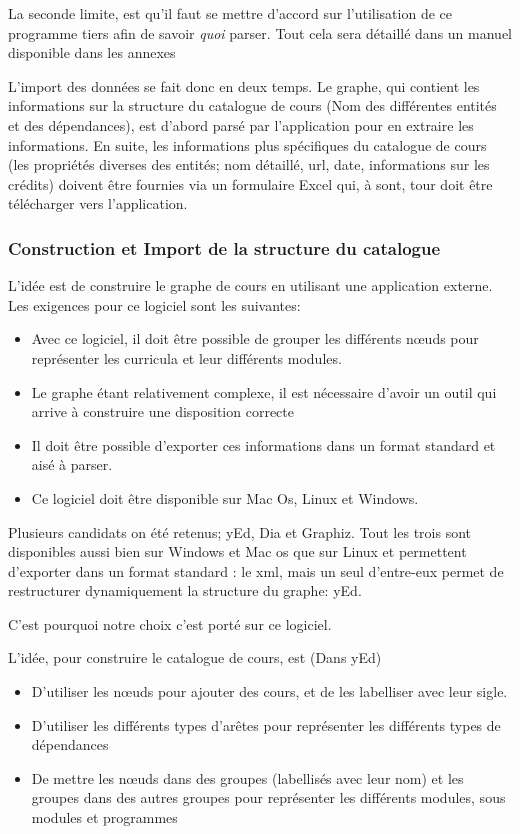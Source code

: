La seconde limite, est qu'il faut se mettre d'accord sur l'utilisation de ce programme tiers afin de savoir \textit{quoi} parser. Tout cela sera détaillé dans un manuel disponible dans les annexes

L'import des données se fait donc en deux temps. Le graphe, qui contient les informations sur la structure du catalogue de cours (Nom des différentes entités et des dépendances), est d'abord parsé par l'application pour en extraire les informations. En suite, les informations plus spécifiques du catalogue de cours (les propriétés diverses des entités; nom détaillé, url, date, informations sur les crédits) doivent être fournies via un formulaire Excel qui, à sont, tour doit être télécharger vers l'application.

\subsubsection{Construction et Import de la structure du catalogue}
L'idée est de construire le graphe de cours en utilisant une application externe. Les exigences pour ce logiciel sont les suivantes:
\begin{itemize}
\item  Avec ce logiciel, il doit être possible de grouper les différents nœuds pour représenter les curricula et leur différents modules.
\item Le graphe étant relativement complexe, il est nécessaire d'avoir un outil qui arrive à construire une disposition correcte
\item Il doit être possible d'exporter ces informations dans un format standard et aisé à parser. 
\item Ce logiciel doit être disponible sur Mac Os, Linux et Windows. 
\end{itemize}

Plusieurs candidats on été retenus; yEd, Dia et Graphiz. Tout les trois sont disponibles aussi bien sur Windows et Mac os que sur Linux et permettent d'exporter dans un format standard : le xml, mais un seul d'entre-eux permet de restructurer dynamiquement la structure du graphe: yEd.

C'est pourquoi notre choix c'est porté sur ce logiciel.

L'idée, pour construire le catalogue de cours, est (Dans yEd)
\begin{itemize}
\item D'utiliser les nœuds pour ajouter des cours, et de les labelliser avec leur sigle.
\item D'utiliser les différents types d'arêtes pour représenter les différents types de dépendances
\item De mettre les nœuds dans des groupes (labellisés avec leur nom) et les groupes dans des autres groupes pour représenter les différents modules, sous modules et programmes
\end{itemize}

